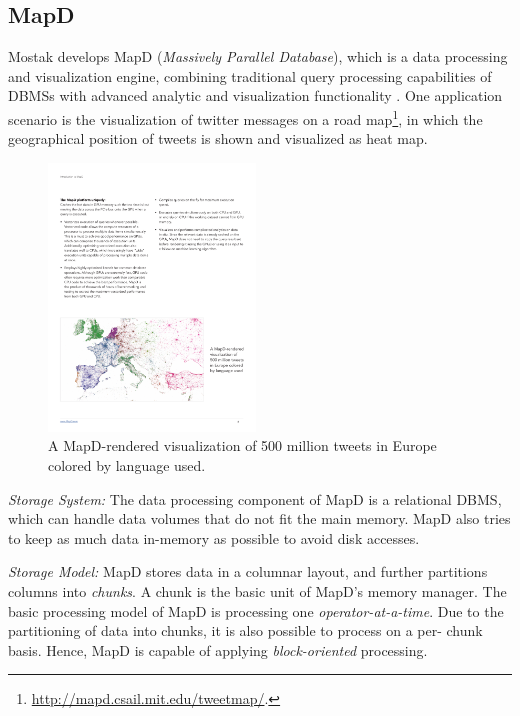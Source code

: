 \documentclass[twocolumn]{article}
\begin{document}
\subsection{MapD}
Mostak develops MapD (\textit{Massively Parallel Database}), which is a data processing and visualization engine, combining traditional query processing capabilities of DBMSs with advanced analytic and visualization functionality \cite{mapd:2015}. 
One application scenario is the visualization of twitter messages on a road map\footnote{\href{http://mapd.csail.mit.edu/tweetmap/}{http://mapd.csail.mit.edu/tweetmap/}.}, in which the geographical position of tweets is shown and visualized as heat map.
\begin{figure}[htb]
        \centering
        \includegraphics[width=0.49\textwidth]{mapd-visualization.pdf}
        \caption{A MapD-rendered visualization of 500 million tweets in Europe colored by language used.}
        \label{fig:mapd-visualization}
\end{figure}

\noindent
\textit{Storage System:} The data processing component of MapD is a relational DBMS, which can handle data volumes that do not fit the main memory. MapD also tries to keep as much data in-memory as possible to avoid disk accesses.

\noindent
\textit{Storage Model:} 
MapD stores data in a columnar layout, and further partitions columns into \textit{chunks}. 
A chunk is the basic unit of MapD's memory manager. 
The basic processing model of MapD is processing one \textit{operator-at-a-time}. 
Due to the partitioning of data into chunks, it is also possible to process on a per- chunk basis. Hence, MapD is capable of applying \textit{block-oriented} processing.
\end{document}
